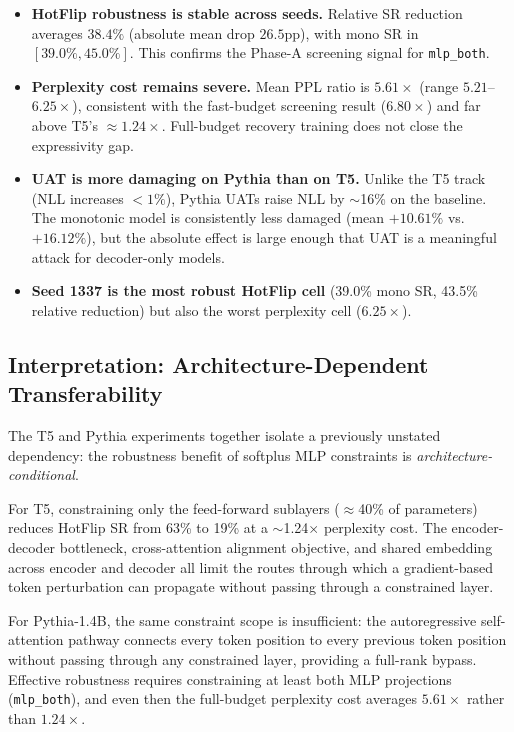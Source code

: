 \documentclass{article}
\begin{document}
\begin{itemize}
    \item \textbf{HotFlip robustness is stable across seeds.} Relative SR reduction averages $38.4\%$ (absolute mean drop $26.5$pp), with mono SR in $[39.0\%, 45.0\%]$. This confirms the Phase-A screening signal for \texttt{mlp\_both}.

    \item \textbf{Perplexity cost remains severe.} Mean PPL ratio is $5.61\times$ (range $5.21$--$6.25\times$), consistent with the fast-budget screening result ($6.80\times$) and far above T5's $\approx 1.24\times$. Full-budget recovery training does not close the expressivity gap.

    \item \textbf{UAT is more damaging on Pythia than on T5.} Unlike the T5 track (NLL increases $<1\%$), Pythia UATs raise NLL by $\sim$16\% on the baseline. The monotonic model is consistently less damaged (mean $+10.61\%$ vs.\ $+16.12\%$), but the absolute effect is large enough that UAT is a meaningful attack for decoder-only models.

    \item \textbf{Seed 1337 is the most robust HotFlip cell} (39.0\% mono SR, 43.5\% relative reduction) but also the worst perplexity cell ($6.25\times$).
\end{itemize}

\subsection{Interpretation: Architecture-Dependent Transferability}

The T5 and Pythia experiments together isolate a previously unstated dependency: the robustness benefit of softplus MLP constraints is \emph{architecture-conditional}.

For T5, constraining only the feed-forward sublayers ($\approx$40\% of parameters) reduces HotFlip SR from 63\% to 19\% at a $\sim$1.24$\times$ perplexity cost. The encoder-decoder bottleneck, cross-attention alignment objective, and shared embedding across encoder and decoder all limit the routes through which a gradient-based token perturbation can propagate without passing through a constrained layer.

For Pythia-1.4B, the same constraint scope is insufficient: the autoregressive self-attention pathway connects every token position to every previous token position without passing through any constrained layer, providing a full-rank bypass. Effective robustness requires constraining at least both MLP projections (\texttt{mlp\_both}), and even then the full-budget perplexity cost averages $5.61\times$ rather than $1.24\times$.
\end{document}
